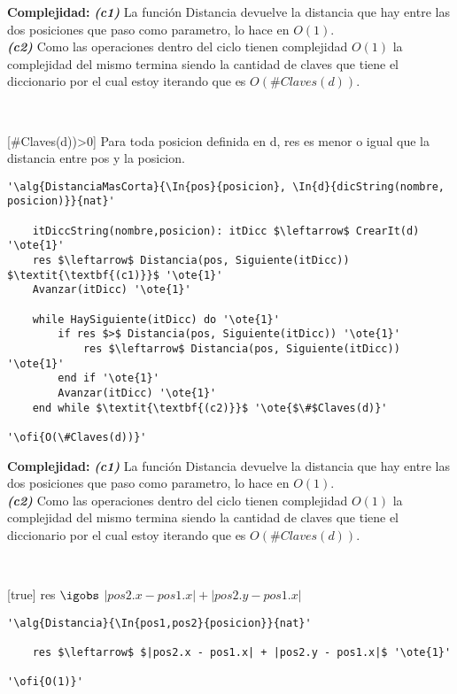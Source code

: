 \textbf{Complejidad:} \textit{\textbf{(c1)}} La función Distancia devuelve la distancia que hay entre las dos posiciones que paso como parametro, lo hace en $O(1)$. \\
\textit{\textbf{(c2)}} Como las operaciones dentro del ciclo tienen complejidad $O(1)$ la complejidad del mismo termina siendo la cantidad de claves que tiene el diccionario por el cual estoy iterando que es $O(\#Claves(d))$.

~


[\#Claves(d))>0]
{Para toda posicion definida en d, res es menor o igual que la distancia entre pos y la posicion.}



\begin{lstlisting}[mathescape]
'\alg{DistanciaMasCorta}{\In{pos}{posicion}, \In{d}{dicString(nombre, posicion)}}{nat}'

	itDiccString(nombre,posicion): itDicc $\leftarrow$ CrearIt(d) '\ote{1}'
	res $\leftarrow$ Distancia(pos, Siguiente(itDicc)) $\textit{\textbf{(c1)}}$ '\ote{1}'
	Avanzar(itDicc) '\ote{1}'

	while HaySiguiente(itDicc) do '\ote{1}'
		if res $>$ Distancia(pos, Siguiente(itDicc)) '\ote{1}'
			res $\leftarrow$ Distancia(pos, Siguiente(itDicc)) '\ote{1}'
		end if '\ote{1}'
		Avanzar(itDicc) '\ote{1}'
	end while $\textit{\textbf{(c2)}}$ '\ote{$\#$Claves(d)}'

'\ofi{O(\#Claves(d))}'
\end{lstlisting}

\textbf{Complejidad:}  \textit{\textbf{(c1)}} La función Distancia devuelve la distancia que hay entre las dos posiciones que paso como parametro, lo hace en $O(1)$. \\
\textit{\textbf{(c2)}} Como las operaciones dentro del ciclo tienen complejidad $O(1)$ la complejidad del mismo termina siendo la cantidad de claves que tiene el diccionario por el cual estoy iterando que es $O(\#Claves(d))$.

~

[true]
{res $\igobs$ $|pos2.x - pos1.x| + |pos2.y - pos1.x|$}


\begin{lstlisting}[mathescape]
'\alg{Distancia}{\In{pos1,pos2}{posicion}}{nat}'

	res $\leftarrow$ $|pos2.x - pos1.x| + |pos2.y - pos1.x|$ '\ote{1}'

'\ofi{O(1)}'
\end{lstlisting}

